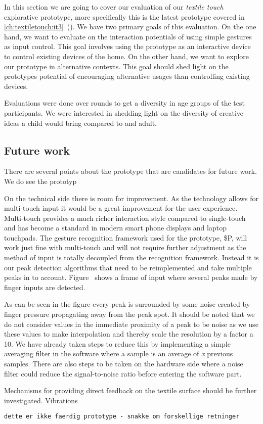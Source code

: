 In this section we are going to cover our evaluation of our \emph{textile touch} explorative prototype, more specifically this is the latest prototype covered in \ref{ch:textiletouch:it3}~().
We have two primary goals of this evaluation.
On the one hand, we want to evaluate on the interaction potentials of using simple gestures as input control.
This goal involves using the prototype as an interactive device to control existing devices of the home.
On the other hand, we want to explore our prototype in alternative contexts.
This goal should shed light on the prototypes potential of encouraging alternative usages than controlling existing devices.

Evaluations were done over  rounds to get a diversity in age groups of the test participants.
We were interested in shedding light on the diversity of creative ideas a child would bring compared to and adult.



\subsection{Future work}
\label{ch:textiletouch:futurework}

There are several points about the prototype that are candidates for future work.
We do see the prototyp

On the technical side there is room for improvement.
As the technology allows for multi-touch input it would be a great improvement for the user experience.
Multi-touch provides a much richer interaction style  compared to single-touch and has become a standard in modern smart phone displays and laptop touchpads.
The gesture recognition framework used for the prototype, \$P, will work just fine with multi-touch and will not require further adjustment as the method of input is totally decoupled from the recognition framework. 
Instead it is our peak detection algorithms that need to be reimplemented and take multiple peaks in to account.
Figure~ shows a frame of input where several peaks made by finger inputs are detected. 

As can be seen in the figure every peak is surrounded by some noise created by finger pressure propagating away from the peak spot.
It should be noted that we do not consider values in the immediate proximity of a peak to be noise as we use these values to make interpolation and thereby scale the resolution by a factor a 10.
We have already taken steps to reduce this by implementing a simple averaging filter in the software 
where a sample is an average of \emph{x} previous samples.
There are also steps to be taken on the hardware side where a noise filter could reduce the signal-to-noise ratio before entering the software part.


Mechanisms for providing direct feedback on the textile surface should be further investigated.
Vibrations \todo{\dots}


\begin{verbatim}
dette er ikke faerdig prototype - snakke om forskellige retninger
\end{verbatim}

